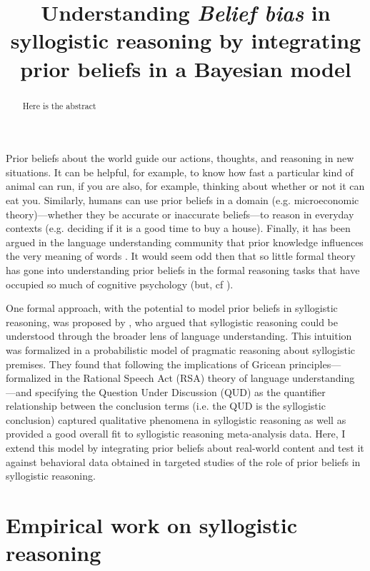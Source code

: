 \documentclass{llncs} %
\title{Understanding \emph{Belief bias} in syllogistic reasoning by integrating prior beliefs in a Bayesian model}
\begin{document}
\maketitle


\begin{abstract}
Here is the abstract
\end{abstract}

Prior beliefs about the world guide our actions, thoughts, and reasoning in new situations. It can be helpful, for example, to know how fast a particular kind of animal can run, if you are also, for example, thinking about whether or not it can eat you. Similarly, humans can use prior beliefs in a domain (e.g. microeconomic theory)---whether they be accurate or inaccurate beliefs---to reason in everyday contexts  (e.g. deciding if it is a good time to buy a house). Finally, it has been argued in the language understanding community that prior knowledge influences the very meaning of words \cite{LassGood2015}. It would seem odd then that so little formal theory has gone into understanding prior beliefs in the formal reasoning tasks that have occupied so much of cognitive psychology (but, cf ). 

One formal approach, with the potential to model prior beliefs in syllogistic reasoning, was proposed by , who argued that syllogistic reasoning could be understood through the broader lens of language understanding. This intuition was formalized in a probabilistic model of pragmatic reasoning about syllogistic premises. They found that following the implications of Gricean principles---formalized in the Rational Speech Act (RSA) theory of language understanding \cite{Frank2012,Goodman2013}---and specifying the Question Under Discussion \cite{Roberts2004} (QUD) as the quantifier relationship between the conclusion terms (i.e. the QUD is the syllogistic conclusion) captured qualitative phenomena in syllogistic reasoning as well as provided a good overall fit to syllogistic reasoning meta-analysis data. Here, I extend this model by integrating prior beliefs about real-world content and test it against behavioral data obtained in targeted studies of the role of prior beliefs in syllogistic reasoning.

\section{Empirical work on syllogistic reasoning}
\end{document}
